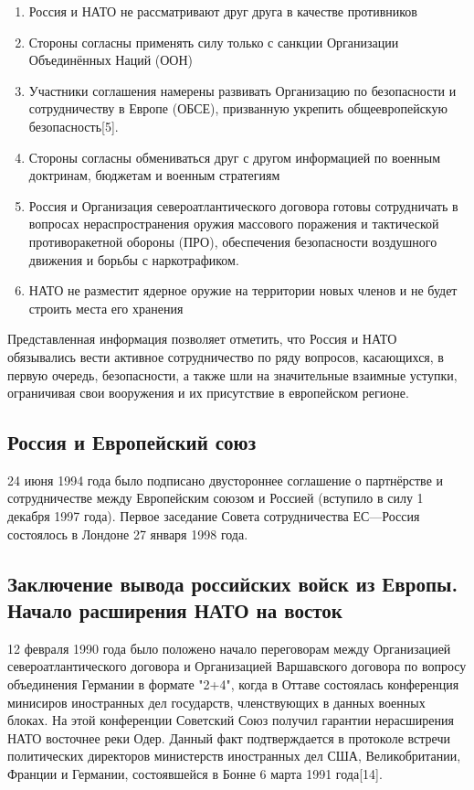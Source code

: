 \begin{enumerate}
  \item Россия и НАТО не рассматривают друг друга в качестве противников
  \item Стороны согласны применять силу только с санкции Организации Объединённых Наций (ООН)
  \item Участники соглашения намерены развивать Организацию по безопасности и сотрудничеству в Европе (ОБСЕ), призванную укрепить общеевропейскую безопасность[5].
  \item Стороны согласны обмениваться друг с другом информацией по военным доктринам, бюджетам и военным стратегиям
  \item Россия и Организация североатлантического договора готовы сотрудничать в вопросах нераспространения оружия массового поражения и тактической противоракетной обороны (ПРО), обеспечения безопасности воздушного движения и борьбы с наркотрафиком.
  \item НАТО не разместит ядерное оружие на территории новых членов и не будет строить места его хранения
\end{enumerate}
  Представленная информация позволяет отметить, что Россия и НАТО обязывались вести активное сотрудничество по ряду вопросов, касающихся, в первую очередь, безопасности, а также шли на значительные взаимные уступки, ограничивая свои вооружения и их присутствие в европейском регионе.
\subsection{Россия и Европейский союз}
24 июня 1994 года было подписано двустороннее соглашение о партнёрстве и сотрудничестве между Европейским союзом и Россией (вступило в силу 1 декабря 1997 года). Первое заседание Совета сотрудничества ЕС—Россия состоялось в Лондоне 27 января 1998 года.
\subsection{Заключение вывода российских войск из Европы. Начало расширения НАТО на восток}
12 февраля 1990 года было положено начало переговорам между Организацией североатлантического договора и Организацией Варшавского договора по вопросу объединения Германии в формате "2+4", когда в Оттаве состоялась конференция минисиров иностранных дел государств, членствующих в данных военных блоках. На этой конференции Советский Союз получил гарантии нерасширения НАТО восточнее реки Одер. Данный факт подтверждается в протоколе встречи политических директоров министерств иностранных дел США, Великобритании, Франции и Германии, состоявшейся в Бонне 6 марта 1991 года[14].

